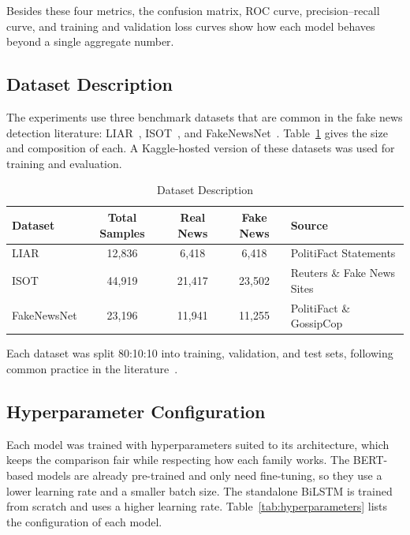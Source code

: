 Besides these four metrics, the confusion matrix, ROC curve, precision--recall curve, and training and validation loss curves show how each model behaves beyond a single aggregate number.

\subsection{Dataset Description}

The experiments use three benchmark datasets that are common in the fake news detection literature: LIAR~\citep{Wang2017Liar}, ISOT~\citep{ISOTDataset}, and FakeNewsNet~\citep{Shu2020FakeNewsNet}. Table~\ref{tab:datasets} gives the size and composition of each. A Kaggle-hosted version of these datasets was used for training and evaluation.

\begin{table}[h]
\centering
\caption{Dataset Description}
\label{tab:datasets}
\begin{tabular}{|l|c|c|c|l|}
\hline
\textbf{Dataset} & \textbf{Total Samples} & \textbf{Real News} & \textbf{Fake News} & \textbf{Source} \\ \hline
LIAR & 12,836 & 6,418 & 6,418 & PolitiFact Statements \\
ISOT & 44,919 & 21,417 & 23,502 & Reuters \& Fake News Sites \\
FakeNewsNet & 23,196 & 11,941 & 11,255 & PolitiFact \& GossipCop \\ \hline
\end{tabular}
\end{table}

Each dataset was split 80:10:10 into training, validation, and test sets, following common practice in the literature~\citep{Kaliyar2021FakeBERT,Rai2022FakeNews}.

\subsection{Hyperparameter Configuration}

Each model was trained with hyperparameters suited to its architecture, which keeps the comparison fair while respecting how each family works. The BERT-based models are already pre-trained and only need fine-tuning, so they use a lower learning rate and a smaller batch size. The standalone BiLSTM is trained from scratch and uses a higher learning rate. Table~\ref{tab:hyperparameters} lists the configuration of each model.

